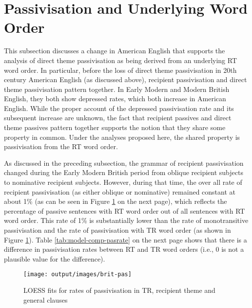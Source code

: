 	\section{Passivisation and Underlying Word Order}\label{sec:pasrate}

	This subsection discusses a change in American English that supports the analysis of direct theme passivisation as being derived from an underlying RT word order. In particular, before the loss of direct theme passivisation in 20th century American English (as discussed above), recipient passivisation and direct theme passivisation pattern together. In Early Modern and Modern British English, they both show depressed rates, which both increase in American English. While the proper account of the depressed passivisation rate and its subsequent increase are unknown, the fact that recipient passives and direct theme passives pattern together supports the notion that they share some property in common. Under the analyses proposed here, the shared property is passivisation from the RT word order.

	As discussed in the preceding subsection, the grammar of recipient passivisation changed during the Early Modern British period from oblique recipient subjects to nominative recipient subjects. However, during that time, the over all rate of recipient passivisation (as either oblique or nominative) remained constant at about 1\% (as can be seen in Figure \ref{fig:brit-pas} on the next page), which reflects the percentage of passive sentences with RT word order out of all sentences with RT word order. This rate of 1\% is substantially lower than the rate of monotransitive passivisation and the rate of passivisation with TR word order (as shown in Figure \ref{fig:brit-pas}). Table \ref{tab:model-comp-pasrate} on the next page shows that there is a difference in passivisation rates between RT and TR word orders (i.e., 0 is not a plausible value for the difference).
	

	\begin{figure}[ht!]
		\texttt{[image: output/images/brit-pas]}
		\caption{LOESS fits for rates of passivisation in TR, recipient theme and general clauses}
		\label{fig:brit-pas}
	\end{figure}

